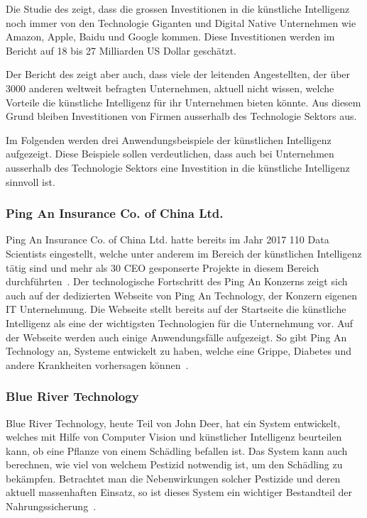 Die Studie des \textcite{Bughin} zeigt, dass die grossen Investitionen in die künstliche Intelligenz noch immer von den Technologie Giganten und Digital Native Unternehmen wie Amazon, Apple, Baidu und Google kommen. Diese Investitionen werden im Bericht auf 18 bis 27 Milliarden US Dollar geschätzt. 

Der Bericht des \textcite{Bughin} zeigt aber auch, dass viele der leitenden Angestellten, der über 3000 anderen weltweit befragten Unternehmen, aktuell nicht wissen, welche Vorteile die künstliche Intelligenz für ihr Unternehmen bieten könnte. Aus diesem Grund bleiben Investitionen von Firmen ausserhalb des Technologie Sektors aus.

Im Folgenden werden drei Anwendungsbeispiele der künstlichen Intelligenz aufgezeigt. Diese Beispiele sollen verdeutlichen, dass auch bei Unternehmen ausserhalb des Technologie Sektors eine Investition in die künstliche Intelligenz sinnvoll ist.

\subsubsection{Ping An Insurance Co. of China Ltd.}

Ping An Insurance Co. of China Ltd. hatte bereits im Jahr 2017 110 Data Scientists eingestellt, welche unter anderem im Bereich der künstlichen Intelligenz tätig sind und mehr als 30 CEO gesponserte Projekte in diesem Bereich durchführten~\autocite{Ransbotham2017}. Der technologische Fortschritt des Ping An Konzerns zeigt sich auch auf der dedizierten Webseite von Ping An Technology, der Konzern eigenen IT Unternehmung. Die Webseite stellt bereits auf der Startseite die künstliche Intelligenz als eine der wichtigsten Technologien für die Unternehmung vor. Auf der Webseite werden auch einige Anwendungsfälle aufgezeigt. So gibt Ping An Technology an, Systeme entwickelt zu haben, welche eine Grippe, Diabetes und andere Krankheiten vorhersagen können~\autocite{PingAnTechnology}.

\subsubsection{Blue River Technology}


Blue River Technology, heute Teil von John Deer, hat ein System entwickelt, welches mit Hilfe von Computer Vision und künstlicher Intelligenz beurteilen kann, ob eine Pflanze von einem Schädling befallen ist. Das System kann auch berechnen, wie viel von welchem Pestizid notwendig ist, um den Schädling zu bekämpfen. Betrachtet man die Nebenwirkungen solcher Pestizide und deren aktuell massenhaften Einsatz, so ist dieses System ein wichtiger Bestandteil der Nahrungssicherung~\autocite{BlueRiverTechnology}.

